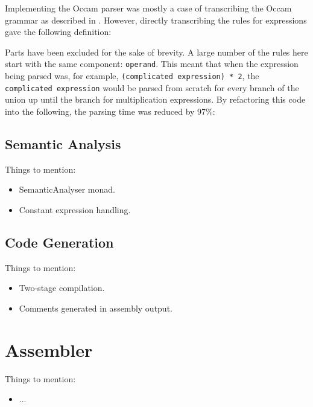Implementing the Occam parser was mostly a case of transcribing the Occam
grammar as described in \cite{jones}. However, directly transcribing the rules
for expressions gave the following definition:

Parts have been excluded for the sake of brevity. A large number of the rules
here start with the same component: \texttt{operand}. This meant that when the
expression being parsed was, for example, \texttt{(complicated expression) * 2},
the \texttt{complicated expression} would be parsed from scratch for every
branch of the union up until the branch for multiplication expressions. By
refactoring this code into the following, the parsing time was reduced by 97\%:


\subsection{Semantic Analysis}

{
  \color{red}
  Things to mention:

  \begin{itemize}
    \item SemanticAnalyser monad.
    \item Constant expression handling.
  \end{itemize}
}

\subsection{Code Generation}

{
  \color{red}
  Things to mention:

  \begin{itemize}
    \item Two-stage compilation.
    \item Comments generated in assembly output.
  \end{itemize}
}

\section{Assembler}

{
  \color{red}
  Things to mention:

  \begin{itemize}
    \item ...
  \end{itemize}
}

